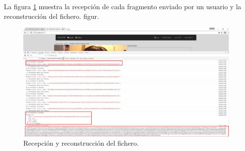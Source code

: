 La figura \ref{fig:FieldReceiveUser} muestra la recepción de cada fragmento enviado por un usuario y la reconstrucción del fichero.
figur.
\begin{figure}[!h]
\centering
\includegraphics[width=1\linewidth]{Figures/filReceiveUser}
\decoRule
\caption[Recepción y reconstrucción del fichero]{Recepción y reconstrucción del fichero.}
\label{fig:FieldReceiveUser}
\end{figure}

